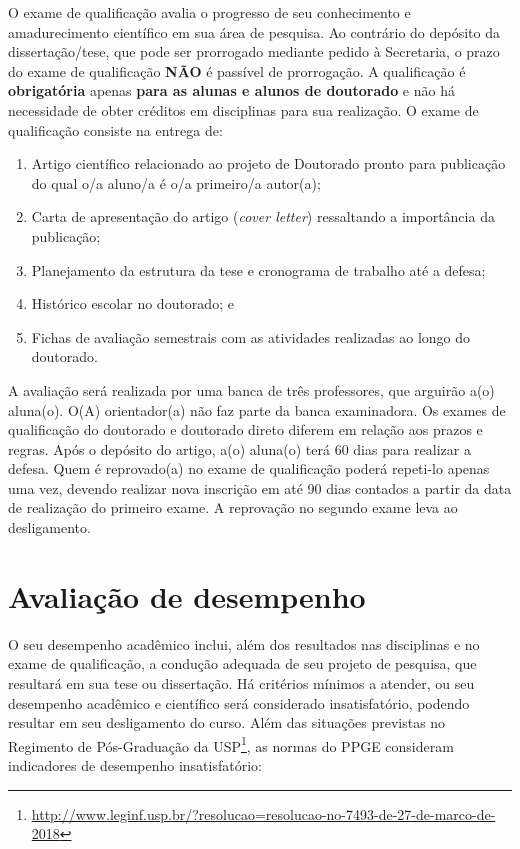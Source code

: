 O exame de qualificação avalia o progresso de seu conhecimento e
amadurecimento científico em sua área de pesquisa. Ao contrário do depósito da dissertação/tese, que pode ser prorrogado mediante pedido à Secretaria, o prazo do exame de qualificação \textbf{NÃO} é passível de prorrogação. A qualificação é
\textbf{obrigatória} apenas \textbf{para as alunas e alunos de doutorado} e
não há necessidade de obter créditos em disciplinas para sua
realização. O exame de qualificação consiste na entrega de:
\begin{enumerate}
\item Artigo científico relacionado ao projeto de Doutorado pronto para publicação do qual o/a aluno/a é o/a primeiro/a autor(a);
\item Carta de apresentação do artigo (\emph{cover letter}) ressaltando a importância da publicação; 
\item Planejamento da estrutura da tese e cronograma de trabalho até a defesa;
\item Histórico escolar no doutorado; e 
\item Fichas de avaliação semestrais com as atividades realizadas ao longo do doutorado.
\end{enumerate}

A avaliação será realizada por uma banca de três professores, que
arguirão a(o) aluna(o). O(A) orientador(a) não faz parte da banca
examinadora. Os exames de qualificação do doutorado e doutorado direto
diferem em relação aos prazos e regras. Após o depósito do artigo, a(o) aluna(o) terá 60 dias para realizar a defesa.
Quem é reprovado(a) no
exame de qualificação poderá repeti-lo apenas uma vez, devendo
realizar nova inscrição em até 90 dias contados a partir da data de
realização do primeiro exame. A reprovação no segundo exame leva ao
desligamento.


\section{Avaliação de desempenho}
\label{sec:conduta}

O seu desempenho acadêmico inclui, além dos resultados nas disciplinas
e no exame de qualificação, a condução adequada de seu projeto de
pesquisa, que resultará em sua tese ou dissertação. Há critérios
mínimos a atender, ou seu desempenho acadêmico e científico será
considerado insatisfatório, podendo resultar em seu desligamento do
curso. Além das situações previstas no Regimento de Pós-Graduação da
USP\footnote{\url{http://www.leginf.usp.br/?resolucao=resolucao-no-7493-de-27-de-marco-de-2018}},
as normas do PPGE consideram indicadores de desempenho insatisfatório:

